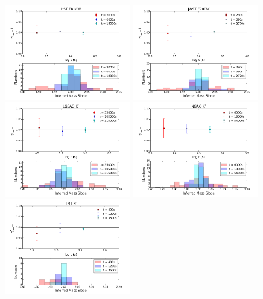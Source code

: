 \documentclass[a4paper,11pt]{article}
\begin{document}
\begin{figure}
\begin{center}
\includegraphics[width=0.49\textwidth]{figures/gamma_hist_135949anti_2QSO_HST.png}
\includegraphics[width=0.49\textwidth]{figures/gamma_hist_135949anti_2QSO_JWST.png} \\
\includegraphics[width=0.49\textwidth]{figures/gamma_hist_135949anti_2QSO_Keck.png}
\includegraphics[width=0.49\textwidth]{figures/gamma_hist_135949anti_2QSO_NGAO.png} \\
\includegraphics[width=0.49\textwidth]{figures/gamma_hist_135949anti_2QSO_TMT.png}

\end{center}
\end{figure}
\end{document}
